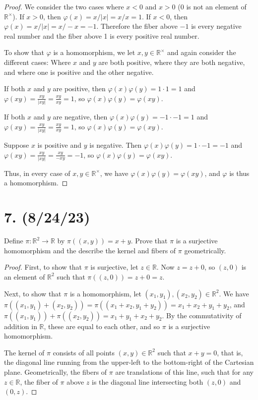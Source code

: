 \documentclass{article}
\begin{document}
\begin{proof}
    We consider the two cases where $x < 0$ and $x > 0$ (0 is not an element of $\mathbb{R}^\times$). If $x > 0$, then $\varphi(x) = x/|x| = x/x = 1$. If $x < 0$, then $\varphi(x) = x/|x| = x/-x = -1$. Therefore the fiber above $-1$ is every negative real number and the fiber above 1 is every positive real number.

    To show that $\varphi$ is a homomorphism, we let $x, y \in \mathbb{R}^\times$ and again consider the different cases: Where $x$ and $y$ are both positive, where they are both negative, and where one is positive and the other negative.

    If both $x$ and $y$ are positive, then $\varphi(x)\varphi(y) = 1 \cdot 1 = 1$ and $\varphi(xy) = \frac{xy}{|xy|} = \frac{xy}{xy} = 1$, so $\varphi(x)\varphi(y) = \varphi(xy)$.

    If both $x$ and $y$ are negative, then $\varphi(x)\varphi(y) = -1 \cdot -1 = 1$ and $\varphi(xy) = \frac{xy}{|xy|} = \frac{xy}{xy} = 1$, so $\varphi(x)\varphi(y) = \varphi(xy)$.

    Suppose $x$ is positive and $y$ is negative. Then $\varphi(x)\varphi(y) = 1 \cdot -1 = -1$ and $\varphi(xy) = \frac{xy}{|xy|} = \frac{xy}{-xy} = -1$, so $\varphi(x)\varphi(y) = \varphi(xy)$.
    
    Thus, in every case of $x, y \in \mathbb{R}^\times$, we have $\varphi(x)\varphi(y) = \varphi(xy)$, and $\varphi$ is thus a homomorphism.
\end{proof}

\section*{7. (8/24/23)}

Define $\pi: \mathbb{R}^2 \rightarrow \mathbb{R}$ by $\pi((x, y)) = x + y$. Prove that $\pi$ is a surjective homomorphism and the describe the kernel and fibers of $\pi$ geometrically.

\begin{proof}
    First, to show that $\pi$ is surjective, let $z \in \mathbb{R}$. Now $z = z + 0$, so $(z, 0)$ is an element of $\mathbb{R}^2$ such that $\pi((z, 0)) = z + 0 = z$.

    Next, to show that $\pi$ is a homomorphism, let $(x_1, y_1), (x_2, y_2) \in \mathbb{R}^2$. We have $\pi((x_1, y_1) + (x_2, y_2)) = \pi((x_1 + x_2, y_1 + y_2)) = x_1 + x_2 + y_1 + y_2$, and $\pi((x_1, y_1)) + \pi((x_2, y_2)) = x_1 + y_1 + x_2 + y_2$. By the commutativity of addition in $\mathbb{R}$, these are equal to each other, and so $\pi$ is a surjective homomorphism.

    The kernel of $\pi$ consists of all points $(x, y) \in \mathbb{R}^2$ such that $x + y = 0$, that is, the diagonal line running from the upper-left to the bottom-right of the Cartesian plane. Geometrically, the fibers of $\pi$ are translations of this line, such that for any $z \in \mathbb{R}$, the fiber of $\pi$ above $z$ is the diagonal line intersecting both $(z, 0)$ and $(0, z)$.
\end{proof}
\end{document}
